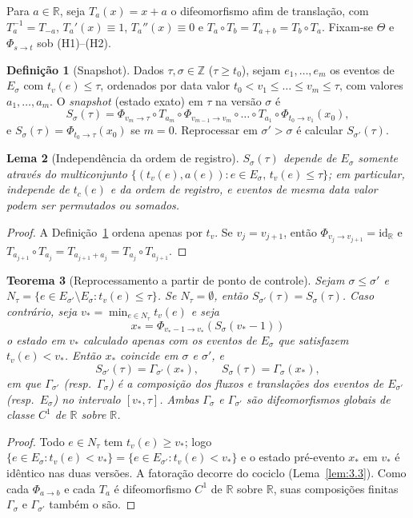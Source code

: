 \documentclass[11pt, a4paper]{article}
\theoremstyle{definition}
\newtheorem{definicao}{Definição}[section]
\theoremstyle{plain}
\newtheorem{teorema}[definicao]{Teorema}
\newtheorem{lema}[definicao]{Lema}
\theoremstyle{remark}
\begin{document}
Para $a \in \mathbb{R}$, seja $T_a(x) = x + a$ o difeomorfismo afim de translação, com $T_a^{-1} = T_{-a}$, $T_a'(x) \equiv 1$, $T_a''(x) \equiv 0$ e $T_a \circ T_b = T_{a+b} = T_b \circ T_a$. Fixam-se $\Theta$ e $\Phi_{s \to t}$ sob (H1)--(H2).

\begin{definicao}[Snapshot]\label{def:4.1}
Dados $\tau, \sigma \in \mathbb{Z}$ ($\tau \ge t_0$), sejam $e_1, \dots, e_m$ os eventos de $E_\sigma$ com $t_v(e) \le \tau$, ordenados por data valor $t_0 < v_1 \le \dots \le v_m \le \tau$, com valores $a_1, \dots, a_m$. O \emph{snapshot} (estado exato) em $\tau$ na versão $\sigma$ é
\[
S_\sigma(\tau) = \Phi_{v_m \to \tau} \circ T_{a_m} \circ \Phi_{v_{m-1} \to v_m} \circ \dots \circ T_{a_1} \circ \Phi_{t_0 \to v_1}(x_0),
\]
e $S_\sigma(\tau) = \Phi_{t_0 \to \tau}(x_0)$ se $m = 0$. Reprocessar em $\sigma' > \sigma$ é calcular $S_{\sigma'}(\tau)$.
\end{definicao}

\begin{lema}[Independência da ordem de registro]\label{lem:4.2}
$S_\sigma(\tau)$ depende de $E_\sigma$ somente através do multiconjunto $\{(t_v(e), a(e)) : e \in E_\sigma,\, t_v(e) \le \tau\}$; em particular, independe de $t_c(e)$ e da ordem de registro, e eventos de mesma data valor podem ser permutados ou somados.
\end{lema}
\begin{proof}
A Definição~\ref{def:4.1} ordena apenas por $t_v$. Se $v_j = v_{j+1}$, então $\Phi_{v_j \to v_{j+1}} = \mathrm{id}_{\mathbb{R}}$ e $T_{a_{j+1}} \circ T_{a_j} = T_{a_{j+1} + a_j} = T_{a_j} \circ T_{a_{j+1}}$.
\end{proof}

\begin{teorema}[Reprocessamento a partir de ponto de controle]\label{teo:4.3}
Sejam $\sigma \le \sigma'$ e $N_\tau = \{e \in E_{\sigma'} \setminus E_\sigma : t_v(e) \le \tau\}$. Se $N_\tau = \emptyset$, então $S_{\sigma'}(\tau) = S_\sigma(\tau)$. Caso contrário, seja $v_* = \min_{e \in N_\tau} t_v(e)$ e seja
\[
x_* = \Phi_{v_* - 1 \to v_*}(S_\sigma(v_* - 1))
\]
o estado em $v_*$ calculado apenas com os eventos de $E_\sigma$ que satisfazem $t_v(e) < v_*$. Então $x_*$ coincide em $\sigma$ e $\sigma'$, e
\[
S_{\sigma'}(\tau) = \Gamma_{\sigma'}(x_*), \qquad S_\sigma(\tau) = \Gamma_\sigma(x_*),
\]
em que $\Gamma_{\sigma'}$ (resp.\ $\Gamma_\sigma$) é a composição dos fluxos e translações dos eventos de $E_{\sigma'}$ (resp.\ $E_\sigma$) no intervalo $[v_*, \tau]$. Ambas $\Gamma_\sigma$ e $\Gamma_{\sigma'}$ são difeomorfismos globais de classe $C^1$ de $\mathbb{R}$ sobre $\mathbb{R}$.
\end{teorema}
\begin{proof}
Todo $e \in N_\tau$ tem $t_v(e) \ge v_*$; logo $\{e \in E_\sigma : t_v(e) < v_*\} = \{e \in E_{\sigma'} : t_v(e) < v_*\}$ e o estado pré-evento $x_*$ em $v_*$ é idêntico nas duas versões. A fatoração decorre do cociclo (Lema~\ref{lem:3.3}). Como cada $\Phi_{a \to b}$ e cada $T_a$ é difeomorfismo $C^1$ de $\mathbb{R}$ sobre $\mathbb{R}$, suas composições finitas $\Gamma_\sigma$ e $\Gamma_{\sigma'}$ também o são.
\end{proof}
\end{document}
